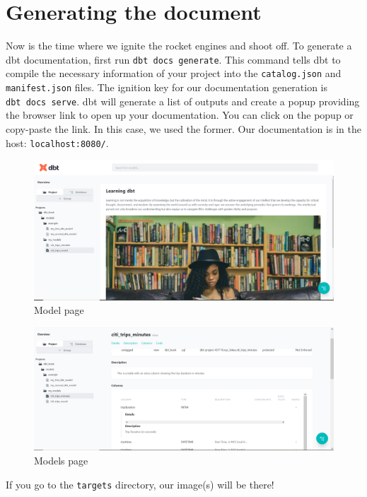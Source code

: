 \documentclass[
]{book}
\begin{document}
\hypertarget{generating-the-document}{%
\section{Generating the document}\label{generating-the-document}}

Now is the time where we ignite the rocket engines and shoot off. To generate a dbt documentation, first run \texttt{dbt\ docs\ generate}. This command tells dbt to compile the necessary information of your project into the \texttt{catalog.json} and \texttt{manifest.json} files. The ignition key for our documentation generation is \texttt{dbt\ docs\ serve}. dbt will generate a list of outputs and create a popup providing the browser link to open up your documentation. You can click on the popup or copy-paste the link. In this case, we used the former. Our documentation is in the host: \texttt{localhost:8080/}.

\begin{figure}
\centering
\includegraphics{./images/overview_page.png}
\caption{Model page}
\end{figure}

\begin{figure}
\centering
\includegraphics{./images/model_page.png}
\caption{Models page}
\end{figure}

If you go to the \texttt{targets} directory, our image(s) will be there!
\end{document}
